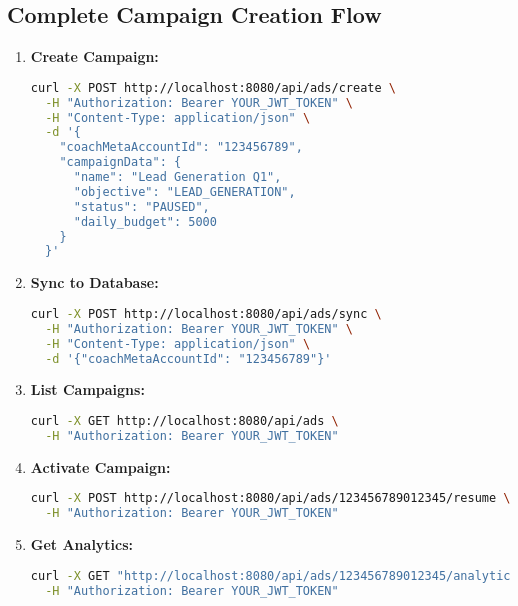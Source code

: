 \documentclass[11pt,a4paper]{article}
\begin{document}
\subsection{Complete Campaign Creation Flow}
\begin{enumerate}
  \item \textbf{Create Campaign:}
    \begin{lstlisting}[language=bash]
curl -X POST http://localhost:8080/api/ads/create \
  -H "Authorization: Bearer YOUR_JWT_TOKEN" \
  -H "Content-Type: application/json" \
  -d '{
    "coachMetaAccountId": "123456789",
    "campaignData": {
      "name": "Lead Generation Q1",
      "objective": "LEAD_GENERATION",
      "status": "PAUSED",
      "daily_budget": 5000
    }
  }'
    \end{lstlisting}

  \item \textbf{Sync to Database:}
    \begin{lstlisting}[language=bash]
curl -X POST http://localhost:8080/api/ads/sync \
  -H "Authorization: Bearer YOUR_JWT_TOKEN" \
  -H "Content-Type: application/json" \
  -d '{"coachMetaAccountId": "123456789"}'
    \end{lstlisting}

  \item \textbf{List Campaigns:}
    \begin{lstlisting}[language=bash]
curl -X GET http://localhost:8080/api/ads \
  -H "Authorization: Bearer YOUR_JWT_TOKEN"
    \end{lstlisting}

  \item \textbf{Activate Campaign:}
    \begin{lstlisting}[language=bash]
curl -X POST http://localhost:8080/api/ads/123456789012345/resume \
  -H "Authorization: Bearer YOUR_JWT_TOKEN"
    \end{lstlisting}

  \item \textbf{Get Analytics:}
    \begin{lstlisting}[language=bash]
curl -X GET "http://localhost:8080/api/ads/123456789012345/analytics?date_preset=last_30d" \
  -H "Authorization: Bearer YOUR_JWT_TOKEN"
    \end{lstlisting}
\end{enumerate}
\end{document}
